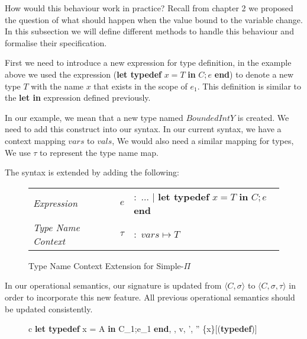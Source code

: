 \documentclass[a4paper,12pt]{report}
\begin{document}
\par
How would this behaviour work in practice? Recall from chapter 2 we proposed the 
question of what should happen when the value bound to the variable change. In 
this subsection we will define different methods to handle this behaviour and 
formalise their specification.

\par
First we need to introduce a new expression for type definition, in the example 
above we used the expression (\textbf{let typedef} $x = T$ \textbf{ in }$C;e$ \textbf {end}) 
to denote a new type $T$ with the name $x$ that exists in the scope of $e_1$. 
This definition is similar to the \textbf{let in} expression defined previously. 

In our example, we mean 
that a new type named $BoundedIntY$ is created. We need to add this construct 
into our syntax. In our current syntax, we have a context mapping $vars$ to 
$vals$, We would also need a similar mapping for types, We use $\tau$ to 
represent the type name map. 

\par
The syntax is extended by adding the following: 
\begin{figure}[H]
  \begin{center}
    \begin{tabular} {l l l}
      \textit{Expression} & $e$ & $:$ ... $|$ \textbf{let typedef }$x = T\textbf{ in } C;e$ \textbf{ end} \\
      \textit{Type Name Context} & $\tau$& $:$ $vars \mapsto T$ \\
    \end{tabular}
  \end{center}
  \caption{Type Name Context Extension for Simple-$\Pi$}
\end{figure}

\par
In our operational semantics, our signature is updated from $\langle C, \sigma \rangle$ 
to $\langle C, \sigma, \tau \rangle$ in order to incorporate this new feature. 
All previous operational semantics should be updated consistently.

\begin{figure}[H]
  \begin{center}
    \begin{tabular} {c}
      {\langle \textbf{let typedef }x = A \textbf{ in }C_1;e_1\textbf{ end}, 
      \sigma, \tau \rangle \Longrightarrow 
        \langle v, \sigma', \tau'' \setminus \{x\}\rangle}[(\textbf{typedef})] \text{ }    
    \end{tabular}
  \end{center}
\end{figure}
\end{document}

